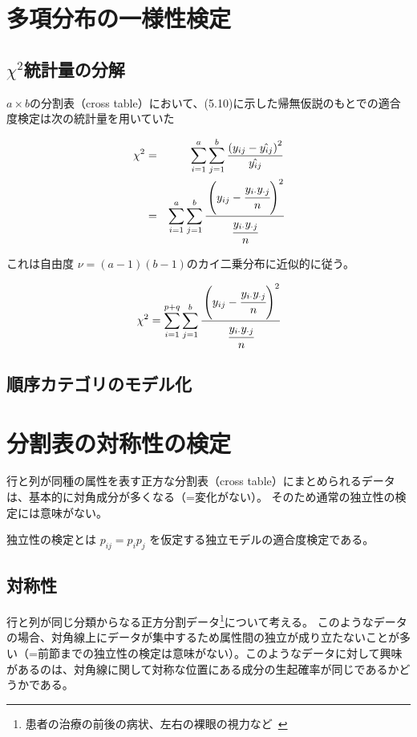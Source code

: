 \documentclass[10pt, a4paper]{ltjsarticle}
\begin{document}
\section{多項分布の一様性検定}

\subsection{$\chi^2$統計量の分解}

$a\times b$の分割表（cross table）において、(5.10)に示した帰無仮説のもとでの適合度検定は次の統計量を用いていた

\begin{eqnarray}
  \chi^2 &=& \sum_{i=1}^a\sum_{j=1}^b  \frac{\left(y_{ij} - \hat{y_{ij}} \right)^2 }{\hat{y_{ij}}} \\
  &=& \sum_{i=1}^a\sum_{j=1}^b \cfrac{\left(y_{ij} - \cfrac{y_{i\cdot}y_{\cdot j}}{n} \right)^2}{\cfrac{y_{i\cdot}y_{\cdot j}}{n}}
\end{eqnarray}

これは自由度 $\nu=(a-1)(b-1)$のカイ二乗分布に近似的に従う。

\begin{eqnarray}
  \chi^2 = \sum_{i=1}^{p+q}\sum_{j=1}^b \cfrac{\left(y_{ij} - \cfrac{y_{i\cdot}y_{\cdot j}}{n} \right)^2}{\cfrac{y_{i\cdot}y_{\cdot j}}{n}}
\end{eqnarray}

\subsection{順序カテゴリのモデル化}

\section{分割表の対称性の検定}


行と列が同種の属性を表す正方な分割表（cross table）にまとめられるデータは、基本的に対角成分が多くなる（=変化がない）。
そのため通常の独立性の検定には意味がない。


独立性の検定とは $p_{ij} = p_ip_j$ を仮定する独立モデルの適合度検定である。



\subsection{対称性}

行と列が同じ分類からなる正方分割データ\footnote{患者の治療の前後の病状、左右の裸眼の視力など~\cite{hirotsu}}について考える。
このようなデータの場合、対角線上にデータが集中するため属性間の独立が成り立たないことが多い（=前節までの独立性の検定は意味がない）。このようなデータに対して興味があるのは、対角線に関して対称な位置にある成分の生起確率が同じであるかどうかである。
\end{document}
